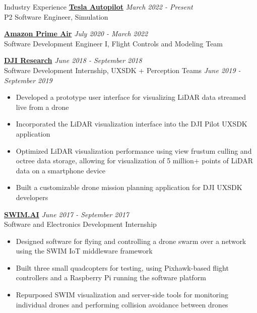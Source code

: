 \documentclass{comran_morshed_resume}
\begin{document}

\begin{rSection}{Industry Experience}
    {\bf\href{https://www.amazon.com/Amazon-Prime-Air/b?ie=UTF8&node=8037720011}{Tesla Autopilot}} \hfill {\textit{March 2022 - Present}} \\
    P2 Software Engineer, Simulation

    {\bf\href{https://www.amazon.com/Amazon-Prime-Air/b?ie=UTF8&node=8037720011}{Amazon Prime Air}} \hfill {\textit{July 2020 - March 2022}} \\
    Software Development Engineer I, Flight Controls and Modeling Team

    {\bf\href{https://www.dji.com/}{DJI Research}} \hfill {\textit{June 2018 - September 2018}} \\
    Software Development Internship, UXSDK + Perception Teams \hfill {\textit{June 2019 - September 2019}}

    \begin{itemize}
        \item Developed a prototype user interface for visualizing LiDAR data streamed live from a drone
        \item Incorporated the LiDAR visualization interface into the DJI Pilot UXSDK application
        \item Optimized LiDAR visualization performance using view frustum culling and octree data storage, allowing for visualization of 5 million+ points of LiDAR data on a smartphone device
        \item Built a customizable drone mission planning application for DJI UXSDK developers
\end{itemize}
    

    {\bf\href{https://www.swim.ai/}{SWIM.AI}} \hfill {\textit{June 2017 - September 2017}} \\
    Software and Electronics Development Internship
    \begin{itemize}
        \item Designed software for flying and controlling a drone swarm over a network using the SWIM IoT middleware framework
        \item Built three small quadcopters for testing, using Pixhawk-based flight controllers and a Raspberry Pi running the software platform
        \item Repurposed SWIM visualization and server-side tools for monitoring individual drones and performing collision avoidance between drones
    \end{itemize}
\end{rSection}
\end{document}

